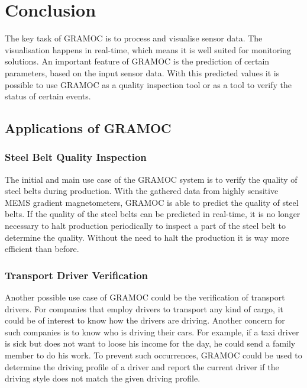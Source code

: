 \chapter{Conclusion}
\label{ch:conclusion}
The key task of GRAMOC is to process and visualise sensor data. The visualisation happens in real-time, which means it is well suited for monitoring solutions. An important feature of GRAMOC is the prediction of certain parameters, based on the input sensor data. With this predicted values it is possible to use GRAMOC as a quality inspection tool or as a tool to verify the status of certain events.

\section{Applications of GRAMOC}

\subsection{Steel Belt Quality Inspection}
The initial and main use case of the GRAMOC system is to verify the quality of steel belts during production. With the gathered data from highly sensitive MEMS gradient magnetometers, GRAMOC is able to predict the quality of steel belts. If the quality of the steel belts can be predicted in real-time, it is no longer necessary to halt production periodically to inspect a part of the steel belt to determine the quality. Without the need to halt the production it is way more efficient than before.

\subsection{Transport Driver Verification}
Another possible use case of GRAMOC could be the verification of transport drivers. For companies that employ drivers to transport any kind of cargo, it could be of interest to know how the drivers are driving. Another concern for such companies is to know who is driving their cars. For example, if a taxi driver is sick but does not want to loose his income for the day, he could send a family member to do his work. To prevent such occurrences, GRAMOC could be used to determine the driving profile of a driver and report the current driver if the driving style does not match the given driving profile.

